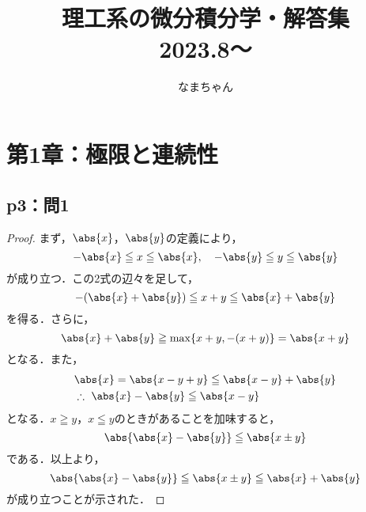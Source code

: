 \documentclass[uplatex,dvipdfmx,a4paper,10pt,fleqn]{jsarticle}
\begin{document}
\title{ \normalsize \textsc{}
		\\ [2.0cm]
		\HRule{1.5pt} \\
		\huge {\uppercase{理工系の微分積分学・解答集}
		\HRule{2.0pt} \\ [0.6cm] \LARGE{2023.8〜} \vspace*{10\baselineskip}}
		}
\date{}
\author{\LARGE なまちゃん}
\maketitle

\newpage 
\begin{multicols*}{3}
    \tableofcontents
\end{multicols*}
\newpage
\section*{第1章：極限と連続性}

\subsection*{p3：問1}

\begin{tleftbar}
    \begin{proof}
        まず，$\abs{x}$，$\abs{y}$の定義により，
        \[
            -\abs{x} \leqq x \leqq  \abs{x},\quad -\abs{y} \leqq y \leqq  \abs{y}
        \]
        が成り立つ．この2式の辺々を足して，
        \[
            -(\abs{x}+\abs{y}) \leqq x+y \leqq \abs{x}+\abs{y}
        \]
        を得る．さらに，
        \[
            \abs{x} + \abs{y} \geqq \max \{ x+y , -(x+y) \} = \abs{x+y}
        \]
        となる．また，
        \begin{align*}
           &  \abs{x}= \abs{x-y +y} \leqq \abs{x-y} +\abs{y} \\
           & \therefore ~ \abs{x} - \abs{y} \leqq \abs{x-y}
        \end{align*}
        となる．$x \geqq y$，$x \leqq y$のときがあることを加味すると，
        \[
            \abs{\abs{x} - \abs{y}} \leqq \abs{x \pm y} 
        \]
        である．以上より，
        \[
            \abs{\abs{x} - \abs{y}} \leqq \abs{x \pm y} \leqq \abs{x}+\abs{y}
        \]
        が成り立つことが示された．
    \end{proof}
\end{tleftbar}
\end{document}
